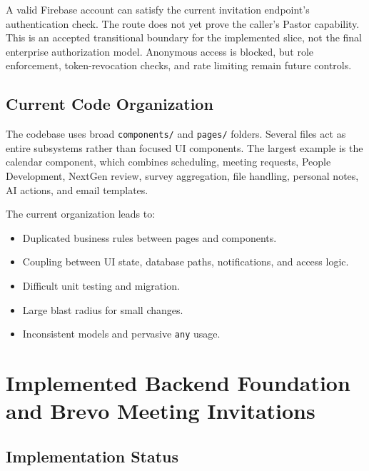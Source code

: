 \documentclass[11pt,a4paper,oneside]{report}
\begin{document}
\begin{warningbox}
A valid Firebase account can satisfy the current invitation endpoint's authentication check. The route does not yet prove the caller's Pastor capability. This is an accepted transitional boundary for the implemented slice, not the final enterprise authorization model. Anonymous access is blocked, but role enforcement, token-revocation checks, and rate limiting remain future controls.
\end{warningbox}


\section{Current Code Organization}

The codebase uses broad \texttt{components/} and \texttt{pages/} folders. Several files act as entire subsystems rather than focused UI components. The largest example is the calendar component, which combines scheduling, meeting requests, People Development, NextGen review, survey aggregation, file handling, personal notes, AI actions, and email templates.

The current organization leads to:

\begin{itemize}
  \item Duplicated business rules between pages and components.
  \item Coupling between UI state, database paths, notifications, and access logic.
  \item Difficult unit testing and migration.
  \item Large blast radius for small changes.
  \item Inconsistent models and pervasive \texttt{any} usage.
\end{itemize}


\chapter{Implemented Backend Foundation and Brevo Meeting Invitations}

\section{Implementation Status}
\end{document}
